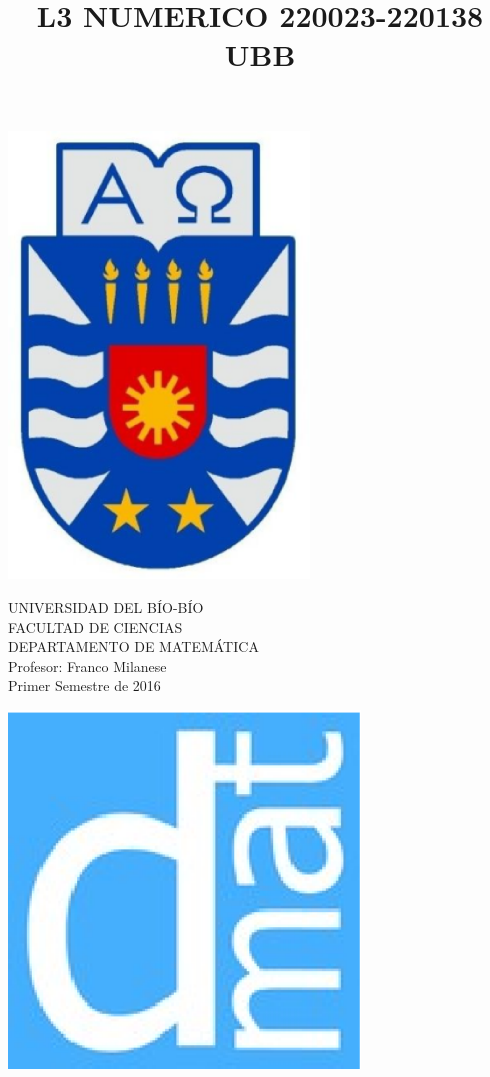 \documentclass[11pt]{article}
\begin{document}
\title{L3 NUMERICO 220023-220138 UBB}

{\begin{minipage}{2cm}
\hspace*{1cm}\includegraphics[width=0.6\textwidth]{escubo-ubb.eps}
\end{minipage}
\begin{minipage}{12cm}
\small
{\bf \rm 
{
\begin{center}
{\footnotesize UNIVERSIDAD DEL B\'IO-B\'IO} \\
{\scriptsize FACULTAD DE CIENCIAS}  \\
{\scriptsize DEPARTAMENTO DE MATEM\'ATICA}  \\
{\scriptsize Profesor:  Franco Milanese}\\
{\scriptsize Primer Semestre de 2016}
\end{center}
}}
\end{minipage}}
{\begin{minipage}{2cm}
\hspace*{-0.5cm}\vspace*{-0.05cm}\includegraphics[width=0.7\textwidth]{escudo-dmat.eps}
\end{minipage}}
\end{document}
